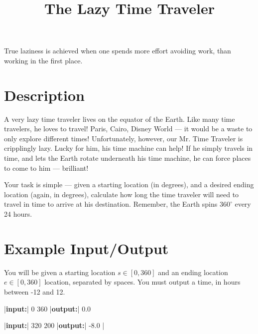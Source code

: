 \documentclass{../codeproblem}
\begin{document}
\title{The Lazy Time Traveler}

\begin{flavor}
  True laziness is achieved when one spends more effort avoiding work,
  than working in the first place.
\end{flavor}

\section*{Description}
A very lazy time traveler lives on the equator of the Earth. Like many
time travelers, he loves to travel! Paris, Cairo, Disney World --- it
would be a waste to only explore different times! Unfortunately,
however, our Mr. Time Traveler is cripplingly lazy. Lucky for him, his
time machine can help! If he simply travels in time, and lets the
Earth rotate underneath his time machine, he can force places to come
to him --- brilliant!

Your task is simple --- given a starting location (in degrees), and a
desired ending location (again, in degrees), calculate how long the
time traveler will need to travel in time to arrive at his
destination. Remember, the Earth spins $360^\circ$ every 24 hours.

\section*{Example Input/Output}

You will be given a starting location $s \in [0, 360]$ and an ending
location $e \in [0, 360]$ location, separated by spaces. You must
output a time, in hours between -12 and 12.

\begin{example}
|\textbf{input:}| 0 360
|\textbf{output:}| 0.0

|\textbf{input:}| 320 200
|\textbf{output:}| -8.0
|\end{example}
\end{document}
